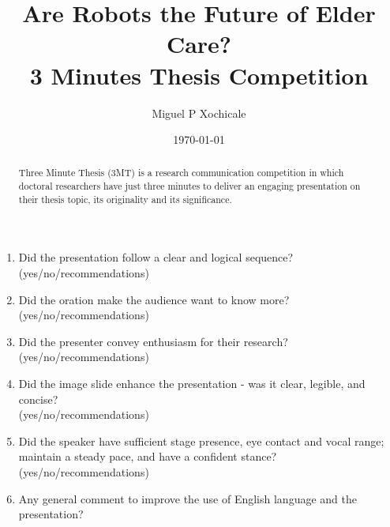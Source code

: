 \documentclass[12pt]{article}
\author{Miguel P Xochicale}
\title{Are Robots the Future of Elder Care?  \\
	3 Minutes Thesis Competition
	}
\date{\today}
\begin{document}
\maketitle


\begin{abstract}
Three Minute Thesis (3MT) is a research communication competition
 in which doctoral researchers have just three minutes to deliver 
an engaging presentation on their thesis topic, its originality 
and its significance.
\end{abstract}

\begin{enumerate}
\item  Did the presentation follow a clear and logical sequence? \\
(yes/no/recommendations) 
\vspace{15mm}

\item  Did the oration make the audience want to know more? \\
(yes/no/recommendations) 
\vspace{15mm}


\item Did the presenter convey enthusiasm for their research? \\
(yes/no/recommendations) 
\vspace{15mm}


\item Did the image slide enhance the presentation - was it clear, 
legible, and concise? \\
(yes/no/recommendations) 
\vspace{15mm}

\item Did the speaker have sufficient stage presence, eye contact and vocal 
range; maintain a steady pace, and have a confident stance?\\
(yes/no/recommendations) 
\vspace{15mm}

\item Any general comment to improve the use of English language 
and the presentation?  
\vspace{15mm}




\end{enumerate}
\end{document}
